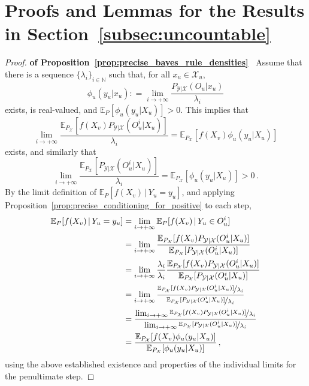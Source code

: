 \documentclass[twoside,11pt]{article}
\newcommand{\nats}{\mathbb{N}}
\newcommand{\states}{\mathcal{X}}
\newcommand{\observs}{\mathcal{Y}}
\newcommand{\coloneqq}{:\!=}
\begin{document}
\section{Proofs and Lemmas for the Results in Section~\ref{subsec:uncountable}}

\begin{proof}{\bf of Proposition~\ref{prop:precise_bayes_rule_densities}~}
Assume that there is a sequence $\{\lambda_i\}_{i\in\nats}$ such that, for all $x_u\in\states_u$,
\begin{equation*}
\phi_u(y_u\vert x_u) \coloneqq \lim_{i\to+\infty}\frac{P_{\observs\vert\states}(O_u\vert x_u)}{\lambda_i}
\end{equation*}
exists, is real-valued, and $\mathbb{E}_P[\phi_u(y_u\vert X_u)]>0$. This implies that
\begin{equation*}
\lim_{i\to+\infty}\frac{\mathbb{E}_{P_\states}[f(X_v)P_{\observs\vert\states}(O_u^i\vert X_u)]}{\lambda_i} = \mathbb{E}_{P_\states}[f(X_v)\phi_u(y_u\vert X_u)]
\end{equation*}
exists, and similarly that
\begin{equation*}
\lim_{i\to+\infty}\frac{\mathbb{E}_{P_\states}[P_{\observs\vert\states}(O_u^i\vert X_u)]}{\lambda_i} = \mathbb{E}_{P_\states}[\phi_u(y_u\vert X_u)] > 0\,.
\end{equation*}
By the limit definition of $\mathbb{E}_P[f(X_v)\,\vert\,Y_u=y_u]$, and applying Proposition~\ref{prop:precise_conditioning_for_positive} to each step,
\begin{align*}
\mathbb{E}_P[f(X_v)\,\vert\,Y_u=y_u] &= \lim_{i\to+\infty} \mathbb{E}_P[f(X_v)\,\vert\,Y_u\in O_u^i] \\
 &= \lim_{i\to+\infty} \frac{\mathbb{E}_{P_\states}[f(X_v)P_{\observs\vert\states}(O_u^i\vert X_u)]}{\mathbb{E}_{P_\states}[P_{\observs\vert\states}(O_u^i\vert X_u)]} \\
 &= \lim_{i\to+\infty} \frac{\lambda_i}{\lambda_i}\frac{\mathbb{E}_{P_\states}[f(X_v)P_{\observs\vert\states}(O_u^i\vert X_u)]}{\mathbb{E}_{P_\states}[P_{\observs\vert\states}(O_u^i\vert X_u)]} \\
 &= \lim_{i\to+\infty} \frac{\nicefrac{\mathbb{E}_{P_\states}[f(X_v)P_{\observs\vert\states}(O_u^i\vert X_u)]}{\lambda_i}}{\nicefrac{\mathbb{E}_{P_\states}[P_{\observs\vert\states}(O_u^i\vert X_u)]}{\lambda_i}} \\
 &= \frac{\lim_{i\to+\infty} \nicefrac{\mathbb{E}_{P_\states}[f(X_v)P_{\observs\vert\states}(O_u^i\vert X_u)]}{\lambda_i}}{\lim_{i\to+\infty} \nicefrac{\mathbb{E}_{P_\states}[P_{\observs\vert\states}(O_u^i\vert X_u)]}{\lambda_i}} \\
 &= \frac{\mathbb{E}_{P_\states}[f(X_v)\phi_u(y_u\vert X_u)]}{\mathbb{E}_{P_\states}[\phi_u(y_u\vert X_u)]}\,,
\end{align*}
using the above established existence and properties of the individual limits for the penultimate step.

\end{proof}
\end{document}
